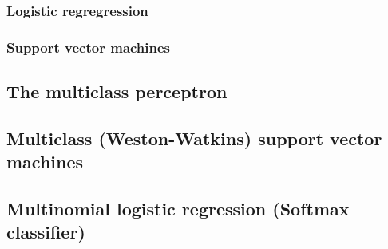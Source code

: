 \subsubsection{Logistic regregression}
\subsubsection{Support vector machines}

\subsection{The multiclass perceptron}
\subsection{Multiclass (Weston-Watkins) support vector machines}
\subsection{Multinomial logistic regression (Softmax classifier)}
